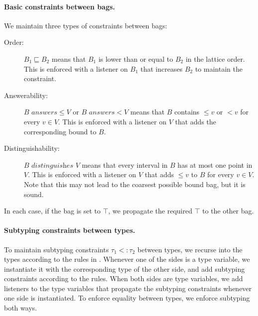 \paragraph{Basic constraints between bags.}
We maintain three types of constraints between bags:
\begin{description}
    \item[Order:] $B_1 \sqsubseteq B_2$ means that $B_1$ is lower than or equal to $B_2$ in the lattice order. This is enforced with a listener on $B_1$ that increases $B_2$ to maintain the constraint.
    \item[Answerability:] $B \textit{ answers} \leq\!\!V$ or $B \textit{ answers} <\!\!V$ means that $B$ contains $\leq\!\!v$ or $<\!\!v$ for every $v \in V$. This is enforced with a listener on $V$ that adds the corresponding bound to $B$.
    \item[Distinguishability:] $B \textit{ distinguishes } V$ means that every interval in $B$ has at most one point in $V$. This is enforced with a listener on $V$ that adds $\leq\!\!v$ to $B$ for every $v \in V$. Note that this may not lead to the coarsest possible bound bag, but it is sound.
\end{description}
In each case, if the bag is set to $\top$, we propagate the required $\top$ to the other bag.

\paragraph{Subtyping constraints between types.}
To maintain subtyping constraints $\tau_1 <: \tau_2$ between types, we recurse into the types according to the rules in . Whenever one of the sides is a type variable, we instantiate it with the corresponding type of the other side, and add subtyping constraints according to the rules. When both sides are type variables, we add listeners to the type variables that propagate the subtyping constraints whenever one side is instantiated. To enforce equality between types, we enforce subtyping both ways.


